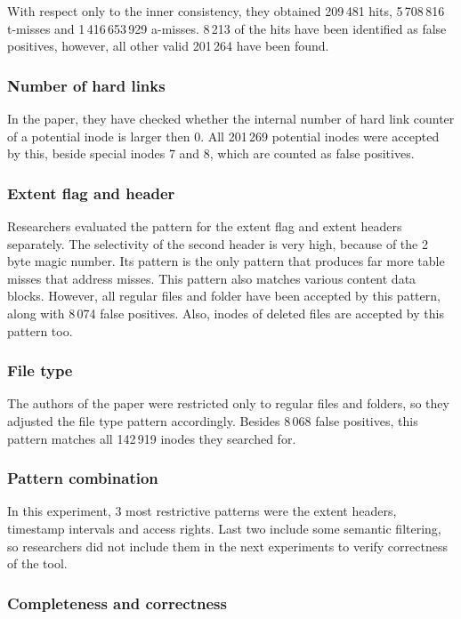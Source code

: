 \documentclass{acm_proc_article-sp}
\begin{document}
With respect only to the inner consistency, they obtained 209\,481 hits, 5\,708\,816 t-misses and 1\,416\,653\,929 a-misses. 8\,213 of the hits have been identified as false positives, however, all other valid 201\,264 have been found.

\subsubsection{Number of hard links}

In the paper, they have checked whether the internal number of hard link counter of a potential inode is larger then 0. All 201\,269 potential inodes were accepted by this, beside special inodes 7 and 8, which are counted as false positives.

\subsubsection{Extent flag and header}

Researchers evaluated the pattern for the extent flag and extent headers separately. The selectivity of the second header is very high, because of the 2 byte magic number. Its pattern is the only pattern that produces far more table misses that address misses. This pattern also matches various content data blocks. However, all regular files and folder have been accepted by this pattern, along with 8\,074 false positives. 
Also, inodes of deleted files are accepted by this pattern too. 

\subsubsection{File type}

The authors of the paper were restricted only to regular files and folders, so they adjusted the file type pattern accordingly. Besides 8\,068 false positives, this pattern matches all 142\,919 inodes they searched for.

\subsubsection{Pattern combination}

In this experiment, 3 most restrictive patterns were the extent headers, timestamp intervals and access rights. Last two include some semantic filtering, so researchers did not include them in the next experiments to verify correctness of the tool.

\subsubsection{Completeness and correctness}
\end{document}
